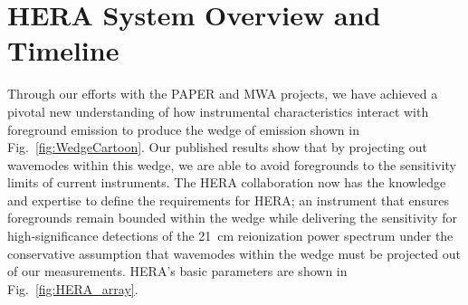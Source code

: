 \documentclass[preprint,11pt]{aastex}
\begin{document}

\vspace{-20pt}
\section{HERA System Overview and Timeline}
\vspace{-5pt}
\label{PDsec}

\noindent Through our efforts with the PAPER and MWA projects, 
we have achieved a pivotal new understanding of how instrumental characteristics interact
with foreground emission to produce the
wedge of emission shown in Fig.~\ref{fig:WedgeCartoon}.
Our published results 
show that by projecting out wavemodes within this
wedge, we are able to avoid foregrounds to the sensitivity limits of current instruments.
The HERA collaboration now has the knowledge and expertise to define
the requirements for HERA; an instrument that ensures foregrounds remain bounded
within the wedge while delivering the sensitivity for
high-significance detections of the 21~cm reionization power spectrum under the
conservative assumption that wavemodes within the
wedge must be projected out of our measurements.
HERA's basic parameters are shown in Fig.~\ref{fig:HERA_array}.
\end{document}
